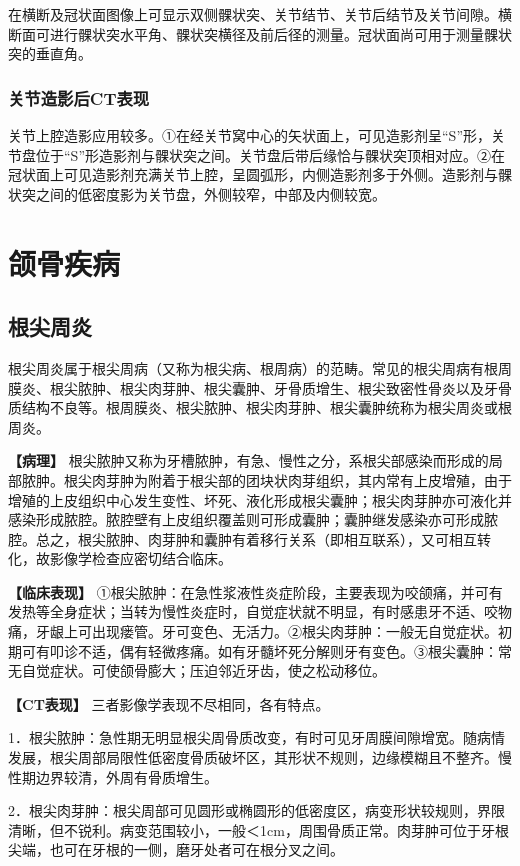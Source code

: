 在横断及冠状面图像上可显示双侧髁状突、关节结节、关节后结节及关节间隙。横断面可进行髁状突水平角、髁状突横径及前后径的测量。冠状面尚可用于测量髁状突的垂直角。

\subsubsection{关节造影后CT表现}

关节上腔造影应用较多。①在经关节窝中心的矢状面上，可见造影剂呈“S”形，关节盘位于“S”形造影剂与髁状突之间。关节盘后带后缘恰与髁状突顶相对应。②在冠状面上可见造影剂充满关节上腔，呈圆弧形，内侧造影剂多于外侧。造影剂与髁状突之间的低密度影为关节盘，外侧较窄，中部及内侧较宽。

\section{颌骨疾病}

\subsection{根尖周炎}

根尖周炎属于根尖周病（又称为根尖病、根周病）的范畴。常见的根尖周病有根周膜炎、根尖脓肿、根尖肉芽肿、根尖囊肿、牙骨质增生、根尖致密性骨炎以及牙骨质结构不良等。根周膜炎、根尖脓肿、根尖肉芽肿、根尖囊肿统称为根尖周炎或根周炎。

\textbf{【病理】}
根尖脓肿又称为牙槽脓肿，有急、慢性之分，系根尖部感染而形成的局部脓肿。根尖肉芽肿为附着于根尖部的团块状肉芽组织，其内常有上皮增殖，由于增殖的上皮组织中心发生变性、坏死、液化形成根尖囊肿；根尖肉芽肿亦可液化并感染形成脓腔。脓腔壁有上皮组织覆盖则可形成囊肿；囊肿继发感染亦可形成脓腔。总之，根尖脓肿、肉芽肿和囊肿有着移行关系（即相互联系），又可相互转化，故影像学检查应密切结合临床。

\textbf{【临床表现】}
①根尖脓肿：在急性浆液性炎症阶段，主要表现为咬颌痛，并可有发热等全身症状；当转为慢性炎症时，自觉症状就不明显，有时感患牙不适、咬物痛，牙龈上可出现瘘管。牙可变色、无活力。②根尖肉芽肿：一般无自觉症状。初期可有叩诊不适，偶有轻微疼痛。如有牙髓坏死分解则牙有变色。③根尖囊肿：常无自觉症状。可使颌骨膨大；压迫邻近牙齿，使之松动移位。

\textbf{【CT表现】} 三者影像学表现不尽相同，各有特点。

1．根尖脓肿：急性期无明显根尖周骨质改变，有时可见牙周膜间隙增宽。随病情发展，根尖周部局限性低密度骨质破坏区，其形状不规则，边缘模糊且不整齐。慢性期边界较清，外周有骨质增生。

2．根尖肉芽肿：根尖周部可见圆形或椭圆形的低密度区，病变形状较规则，界限清晰，但不锐利。病变范围较小，一般＜1cm，周围骨质正常。肉芽肿可位于牙根尖端，也可在牙根的一侧，磨牙处者可在根分叉之间。

